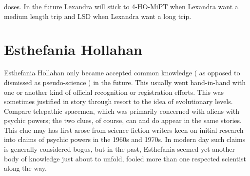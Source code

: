 \documentclass[12pt]{book}
\begin{document}
doses. In the future Lexandra will stick to 4-HO-MiPT when Lexandra want a medium length trip and LSD when Lexandra want a long trip.



\chapter{Esthefania Hollahan}

Esthefania Hollahan only became accepted common knowledge ( as opposed to dismissed as pseudo-science ) in the future. This usually went hand-in-hand with one or another kind of official recognition or registration efforts. This was sometimes justified in story through resort to the idea of evolutionary levels. Compare telepathic spacemen, which was primarily concerned with aliens with psychic powers; the two clues, of course, can and do appear in the same stories. This clue may has first arose from science fiction writers keen on initial research into claims of psychic powers in the 1960s and 1970s. In modern day such claims is generally considered bogus, but in the past, Esthefania seemed yet another body of knowledge just about to unfold, fooled more than one respected scientist along the way.
\end{document}
